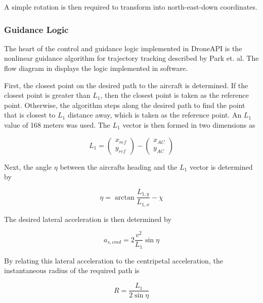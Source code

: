 \documentclass{aiaa}
\begin{document}
    A simple rotation is then required to transform into north-east-down coordinates.

\subsubsection{Guidance Logic}

The heart of the control and guidance logic implemented in DroneAPI is the nonlinear guidance algorithm for trajectory tracking described by Park et. al. The flow diagram in  displays the logic implemented in software. 


First, the closest point on the desired path to the aircraft is determined. If the closest point is greater than $L_1$, then the closest point is taken as the reference point. Otherwise, the algorithm steps along the desired path to find the point that is closest to $L_1$ distance away, which is taken as the reference point. An $L_1$ value of 168 meters was used. The $L_1$ vector is then formed in two dimensions as

\begin{equation}
	L_1 = 
    \begin{pmatrix}
    	x_{ref}\\
        y_{ref}
    \end{pmatrix}
    -
    \begin{pmatrix}
    	x_{AC}\\
        y_{AC}
    \end{pmatrix}
\end{equation}

Next, the angle $\eta$ between the aircrafts heading and the $L_1$ vector is determined by

\begin{equation}
	\eta = \arctan{\frac{L_{1,y}}{L_{1,x}}} - \chi
\end{equation}

The desired lateral acceleration is then determined by

\begin{equation}
	a_{s,cmd} = 2\frac{v^2}{L_1}\sin{\eta}
    \end{equation}
    
    By relating this lateral acceleration to the centripetal acceleration, the instantaneous radius of the required path is
    
    \begin{equation}
    R = \frac{L_1}{2\sin{\eta}}
    \end{equation}
    
\end{document}
